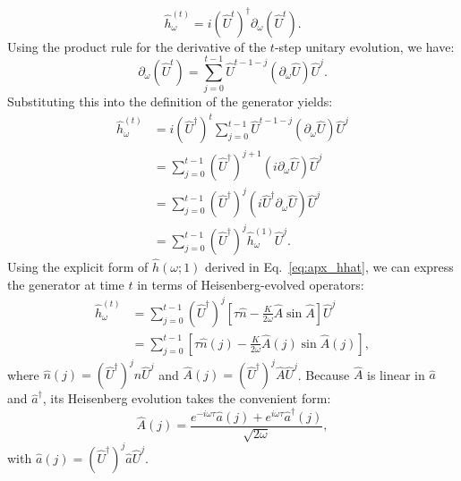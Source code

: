 \documentclass[amsmath,nobibnotes,aps,amssymb,pra, prl,aps,showpacs,superscriptaddress,twocolumn, longbibliography, reprint]{revtex4-2}
\begin{document}
\begin{equation}
    \label{eq:generator_t_def}
    \hat{h}^{(t)}_{\omega} = i (\hat{U}^t)^\dagger \partial_\omega (\hat{U}^t).
\end{equation}
Using the product rule for the derivative of the $t$-step unitary evolution, we have:
\begin{equation}
    \partial_\omega (\hat{U}^t) = \sum_{j=0}^{t-1} \hat{U}^{t-1-j} (\partial_\omega \hat{U}) \hat{U}^j.
\end{equation}
Substituting this into the definition of the generator yields:
\begin{equation}
    \label{eq:generator_t_sum}
    \begin{split}
        \hat{h}^{(t)}_{\omega} &= i (\hat{U}^\dagger)^t \sum_{j=0}^{t-1} \hat{U}^{t-1-j} (\partial_\omega \hat{U}) \hat{U}^j \\
        &= \sum_{j=0}^{t-1} (\hat{U}^\dagger)^{j+1} (i\partial_\omega \hat{U}) \hat{U}^j \\
        &= \sum_{j=0}^{t-1} (\hat{U}^\dagger)^j \left( i \hat{U}^\dagger \partial_\omega \hat{U} \right) \hat{U}^j \\
        &= \sum_{j=0}^{t-1} (\hat{U}^\dagger)^j \hat{h}^{(1)}_{\omega} \hat{U}^j.
    \end{split}
\end{equation}
Using the explicit form of $\hat{h}(\omega; 1)$ derived in Eq.~\eqref{eq:apx_hhat}, we can express the generator at time $t$ in terms of Heisenberg-evolved operators:
\begin{equation}
    \label{eq:generator_t_final}
    \begin{split}
        \hat{h}^{(t)}_{\omega} &= \sum_{j=0}^{t-1} (\hat{U}^\dagger)^j \left[ \tau \hat{n} - \frac{K}{2\omega} \hat{A}\sin{\hat{A}} \right] \hat{U}^j \\
        &= \sum_{j=0}^{t-1} \left[ \tau \hat{n}(j) - \frac{K}{2\omega} \hat{A}(j)\sin{\hat{A}(j)} \right],
    \end{split}
\end{equation}
where $\hat{n}(j) = (\hat{U}^\dagger)^j \hat{n} \hat{U}^j$ and $\hat{A}(j) = (\hat{U}^\dagger)^j \hat{A} \hat{U}^j$. Because $\hat{A}$ is linear in $\hat{a}$ and $\hat{a}^\dagger$, its Heisenberg evolution takes the convenient form:
\begin{equation}
    \hat{A}(j) = \frac{e^{-i\omega\tau}\hat{a}(j) + e^{i\omega\tau}\hat{a}^\dagger(j)}{\sqrt{2\omega}},
\end{equation}
with $\hat{a}(j) = (\hat{U}^\dagger)^j \hat{a} \hat{U}^j$.
\end{document}
